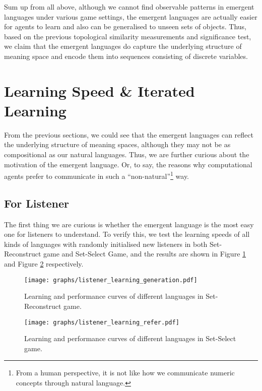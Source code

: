 Sum up from all above, although we cannot find observable patterns in emergent languages under various game settings, the emergent languages are actually easier for agents to learn and also can be generalised to unseen sets of objects. Thus, based on the previous topological similarity measurements and significance test, we claim that the emergent languages do capture the underlying structure of meaning space and encode them into sequences consisting of discrete variables.


\section{Learning Speed \& Iterated Learning}
\label{sec4.3:learning_speed}

From the previous sections, we could see that the emergent languages can reflect the underlying structure of meaning spaces, although they may not be as compositional as our natural languages. Thus, we are further curious about the motivation of the emergent language. Or, to say, the reasons why computational agents prefer to communicate in such a ``non-natural''\footnote{From a human perspective, it is not like how we communicate numeric concepts through natural language.} way.

\subsection{For Listener}
\label{ssec4.3.1:learning_listener}

The first thing we are curious is whether the emergent language is the most easy one for listeners to understand. To verify this, we test the learning speeds of all kinds of languages with randomly initialised new listeners in both Set-Reconstruct game and Set-Select Game, and the results are shown in Figure \ref{fig4.1:listener_learning_generation} and Figure \ref{fig4.2:listener_learning_refer} respectively.

\begin{figure}[!h]
    \centering
    \texttt{[image: graphs/listener\_learning\_generation.pdf]}
    \caption{Learning and performance curves of different languages in Set-Reconstruct game.}
    \label{fig4.1:listener_learning_generation}
\end{figure}

\begin{figure}[!h]
    \centering
    \texttt{[image: graphs/listener\_learning\_refer.pdf]}
    \caption{Learning and performance curves of different languages in Set-Select game.}
    \label{fig4.2:listener_learning_refer}
\end{figure}

